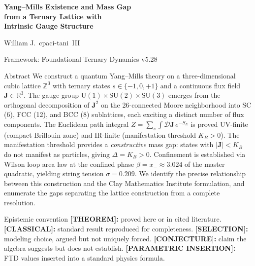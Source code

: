 \documentclass[11pt]{article}
\theoremstyle{tight}
\theoremstyle{plainroman}
\newcommand{\R}{\mathbb{R}}
\newcommand{\Z}{\mathbb{Z}}
\begin{document}
\begin{titlepage}
\centering
\vspace*{1.8cm}
{\fontsize{21}{26}\selectfont\bfseries\color{accent}
Yang--Mills Existence and Mass Gap\\[0.3em]
from a Ternary Lattice with\\[0.3em]
Intrinsic Gauge Structure\par}
\vspace{0.8cm}
{\large William J.\ cpaci-tani~III\par}
\vspace{0.3cm}
{\normalsize Framework: Foundational Ternary Dynamics v5.28\par}
\vspace{1.2cm}
\begin{minipage}{0.86\textwidth}
\begin{statusbox}{Abstract}
We construct a quantum Yang--Mills theory on a three-dimensional cubic lattice $\Z^3$ with ternary states $s\in\{-1,0,+1\}$ and a continuous flux field $\mathbf J\in\R^3$.
The gauge group $\mathrm{U}(1)\times\mathrm{SU}(2)\times\mathrm{SU}(3)$ emerges from the orthogonal decomposition of $\mathbf J^2$ on the 26-connected Moore neighborhood into SC (6), FCC (12), and BCC (8) sublattices, each exciting a distinct number of flux components.
The Euclidean path integral $Z=\sum_s\int\mathcal D\mathbf J\,e^{-S_E}$ is proved UV-finite (compact Brillouin zone) and IR-finite (manifestation threshold $K_B>0$).
The manifestation threshold provides a \emph{constructive} mass gap: states with $|\mathbf J|<K_B$ do not manifest as particles, giving $\Delta=K_B>0$.
Confinement is established via Wilson loop area law at the confined phase $\beta=x_-\approx 3.024$ of the master quadratic, yielding string tension $\sigma=0.209$.
We identify the precise relationship between this construction and the Clay Mathematics Institute formulation, and enumerate the gaps separating the lattice construction from a complete resolution.
\end{statusbox}
\end{minipage}
\vfill
\end{titlepage}
\tableofcontents
\thispagestyle{empty}
\clearpage

\begin{statusbox}{Epistemic convention}
\textbf{[THEOREM]:} proved here or in cited literature.
\textbf{[CLASSICAL]:} standard result reproduced for completeness.
\textbf{[SELECTION]:} modeling choice, argued but not uniquely forced.
\textbf{[CONJECTURE]:} claim the algebra suggests but does not establish.
\textbf{[PARAMETRIC INSERTION]:} FTD values inserted into a standard physics formula.
\end{statusbox}
\end{document}
